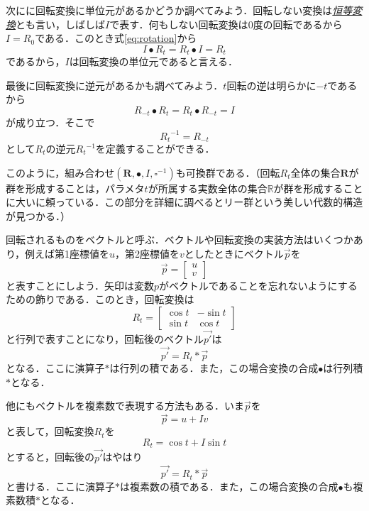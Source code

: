 \documentclass[a4paper]{jsbook}
\newcommand{\keyword}[1]{{\underline{\emph{#1}}}}
\newcommand{\mathSet}[1]{\mathbf{#1}} %
\newcommand{\mathSpecialSet}[1]{\mathbb{#1}} %
\newcommand{\mathVectorVar}[1]{\vec{#1}}
\newcommand{\mathSomething}{\square}  %
\newcommand{\mathCompose}{\mathbin{\bullet}}
\newcommand{\mathGroup}[4]{(#1,#2,#3,#4)}
\begin{document}
次にに回転変換に単位元があるかどうか調べてみよう．回転しない変換は\keyword{恒等変換}とも言い，しばしば$I$で表す．何もしない回転変換は$0$度の回転であるから$I=R_0$である．このとき式\eqref{eq:rotation}から
\begin{equation}
I\bullet R_t=R_t\bullet I=R_t
\end{equation}
であるから，$I$は回転変換の単位元であると言える．

最後に回転変換に逆元があるかも調べてみよう．$t$回転の逆は明らかに$-t$であるから
\begin{equation}
R_{-t}\bullet R_t=R_t\bullet R_{-t}=I
\end{equation}
が成り立つ．そこで
\begin{equation}
{R_t}^{-1}=R_{-t}
\end{equation}
として$R_t$の逆元${R_t}^{-1}$を定義することができる．

このように，組み合わせ$\mathGroup{\mathSet{R}}{\bullet}{I}{\mathSomething^{-1}}$も可換群である．（回転$R_t$全体の集合$\mathSet{R}$が群を形成することは，パラメタ$t$が所属する実数全体の集合$\mathSpecialSet{R}$が群を形成することに大いに頼っている．この部分を詳細に調べるとリー群という美しい代数的構造が見つかる．）

回転されるものをベクトルと呼ぶ．ベクトルや回転変換の実装方法はいくつかあり，例えば第1座標値を$u$，第2座標値を$v$としたときにベクトル$\mathVectorVar{p}$を
\begin{equation}
\mathVectorVar{p}=\begin{bmatrix}u\\v\end{bmatrix}
\end{equation}
と表すことにしよう．矢印は変数$p$がベクトルであることを忘れないようにするための飾りである．このとき，回転変換は
\begin{equation}
R_t=\begin{bmatrix}\cos t&-\sin t\\\sin t&\cos t\end{bmatrix}
\end{equation}
と行列で表すことになり，回転後のベクトル$\mathVectorVar{p'}$は
\begin{equation}
\mathVectorVar{p'}=R_t*\mathVectorVar{p}
\end{equation}
となる．ここに演算子$*$は行列の積である．また，この場合変換の合成$\mathCompose$は行列積$*$となる．

他にもベクトルを複素数で表現する方法もある．いま$\mathVectorVar{p}$を
\begin{equation}
\mathVectorVar{p}=u+I v
\end{equation}
と表して，回転変換$R_t$を
\begin{equation}
R_t=\cos t+I\sin t
\end{equation}
とすると，回転後の$\mathVectorVar{p'}$はやはり
\begin{equation}
\mathVectorVar{p'}=R_t*\mathVectorVar{p}
\end{equation}
と書ける．ここに演算子$*$は複素数の積である．また，この場合変換の合成$\mathCompose$も複素数積$*$となる．
\end{document}
